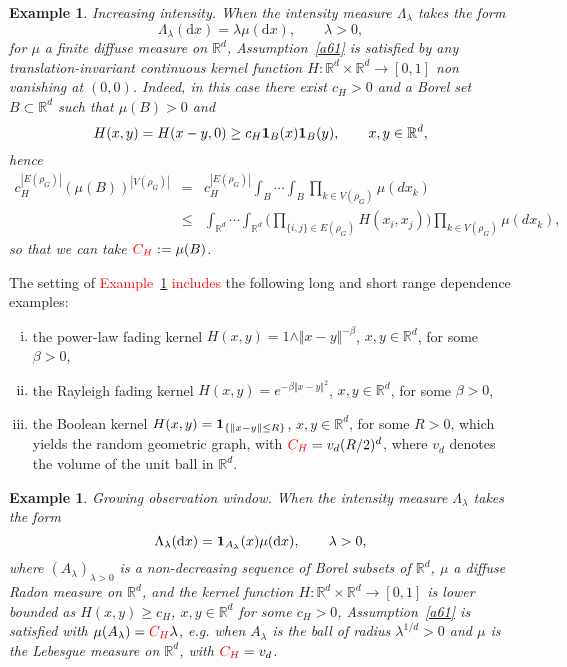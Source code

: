 \documentclass[12pt]{article}
\newcommand{\R}{\mathbb{R}}
\newcommand{\bone}{{\bf 1}}
\newtheorem{example}[prop]{Example}
\def\real{{\mathord{\mathbb R}}}
\numberwithin{equation}{section}
\begin{document}
\noindent
\begin{example}
  \label{examplea}
  Increasing intensity. 
  When the intensity measure $\Lambda_\lambda$ takes the form 
$$\Lambda_\lambda (\mathrm{d}x)=\lambda\mu(\mathrm{d}x),\qquad\lambda>0,$$
 for $\mu$ a finite diffuse measure on $\R^d$, 
 Assumption~\ref{a61} is satisfied by any translation-invariant
 continuous kernel function $H : \real^d\times \real^d \to [0,1]$ non vanishing at $(0,0)$. 
 Indeed, in this case there exist $c_H>0$ and a Borel set $B\subset \real^d$
 such that $\mu ( B)>0$ and
$$
H(x,y) = H(x-y,0) \geq c_H \bone_B(x)\bone_B(y), \qquad x,y \in \real^d,
$$
hence 
\begin{eqnarray*} 
  c_H^{|E(\rho_G)|} ( \mu ( B ))^{|V(\rho_G)|} & = & 
  c_H^{|E(\rho_G)|}
  \int_B \cdots \int_B 
  \prod_{k\in V(\rho_G) } \mu (dx_k)
  \\
   & \leq &  
  \int_{\R^d}\cdots\int_{\R^d}
  \Bigg(
  \prod_{\{i,j\}\in E(\rho_G)} H(x_i,x_j)
  \Bigg)
  \prod_{k\in V(\rho_G) } \mu (dx_k), 
\end{eqnarray*}
so that we can take $\textcolor{red}{C_H} := \mu (B)$. 
\end{example}
The setting of \textcolor{red}{Example~\ref{examplea}
 includes} the following long and short range dependence examples: 
\begin{enumerate}[i)]
\item
 the power-law fading kernel 
 $H(x,y) = 1 \wedge \Vert x - y \Vert^{- \beta}$, $x,y\in \real^d$, for some $\beta > 0$,  
\item
 the Rayleigh fading kernel $H(x,y) = e^{ - \beta \Vert x - y\Vert^2}$, $x,y\in \real^d$, for some $\beta > 0$, 
\item
 the Boolean kernel $H(x,y)=\bone_{\{\|x-y\|\leq R \}}$, $x,y\in \real^d$,
 for some $R >0$, which yields the random geometric graph, with
 $\textcolor{red}{C_H} = v_d (R /2)^d$,
 where $v_d$ denotes the volume of the unit ball in $\real^d$. 
\end{enumerate}
\vspace{-0.8cm}
\noindent
\begin{example}
  \label{exampleb}
  Growing observation window. 
  When the intensity measure $\Lambda_\lambda$ takes the form 
$$\Lambda_\lambda (\mathrm{d}x)= {\bf 1}_{A_\lambda} (x) \mu(\mathrm{d}x),\qquad\lambda>0,$$
  where $(A_\lambda )_{\lambda >0}$ is a non-decreasing sequence
  of Borel subsets of $\real^d$, 
  $\mu$ a %
  diffuse Radon measure on $\R^d$, 
  and the kernel function $H : \real^d\times \real^d \to [0,1]$
  is lower bounded as $H(x,y) \geq c_H$, $x,y\in \real^d$ for some $c_H>0$,
  Assumption~\ref{a61} is satisfied with 
  $\mu ( A_\lambda ) = \textcolor{red}{C_H} \lambda$,
  e.g. when $A_\lambda$ is  the ball of radius $\lambda^{1/d} >0$
  and $\mu$ is the Lebesgue measure on $\real^d$,
  with $\textcolor{red}{C_H} = v_d$. 
\end{example} 
\end{document}
